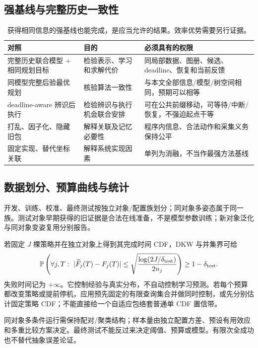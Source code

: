 \documentclass[11pt,a4paper,fontset=fandol]{ctexart}
\theoremstyle{definition}
\theoremstyle{remark}\newtheorem{remark}[theorem]{说明}
\numberwithin{equation}{section}
\begin{document}
\subsection{强基线与完整历史一致性}
\begin{table}[htbp]\centering\small
\begin{tabularx}{\linewidth}{P{.29\linewidth}YY}\toprule
对照 & 目的 & 必须具有的权限\\\midrule
完整历史联合模型 + 相同规划目标 & 检验表示、学习和求解代价 & 同局部数据、图册、候选、deadline、恢复和当前反馈\\
同模型完整后验最优规划 & 核验算法一致性 & 与本文全部信息/模型/树空间相同，预期可以相等\\
deadline-aware 辨识后执行 & 检验辨识与执行机会联合安排 & 可在公共前缀移动，可等待/中断/恢复，不强迫起点干等\\
打乱、因子化、隐藏旧包 & 解释关联及记忆必要性 & 程序内信息、合法动作和采集义务保持公平\\
固定实现、替代坐标关联 & 解释系统实现因素 & 单列为消融，不当作最强方法基线\\\bottomrule
\end{tabularx}
\caption{获得相同信息的强基线也能完成，是应当允许的结果。效率优势需要另行证据。}
\end{table}

\subsection{数据划分、预算曲线与统计}
开发、训练、校准、最终测试按独立对象/配置族划分；同对象多姿态属于同一族。测试对象早期获得的旧证据是合法在线准备，不是模型参数训练；新对象泛化与同对象变姿复用分别报告。

若固定 $J$ 棵策略并在独立对象上得到其完成时间 CDF，DKW 与并集界可给
\begin{equation}
 \mathbb P\left(\forall j,T:\ |\widehat F_j(T)-F_j(T)|\le
 \sqrt{\frac{\log(2J/\delta_{\rm test})}{2n_j}}\right)\ge1-\delta_{\rm test}.
 \label{eq:dkw}
\end{equation}
失败时间记为 $+\infty$。它控制经验与真实分布，不自动控制学习预测。若每个预算都改变策略或提前停机，应用预先固定的有限查询集合并做同时控制，或先分别估计固定策略 CDF；不能直接给一个自适应包络套普通单 CDF 置信带。

同对象多条件运行需保持配对/聚类结构；样本量由独立配置方差、预设有用效应和多重比较方案决定。最终测试不能反过来决定阈值、预算或模型。有限次全成功也不替代抽象误差论证。
\end{document}
